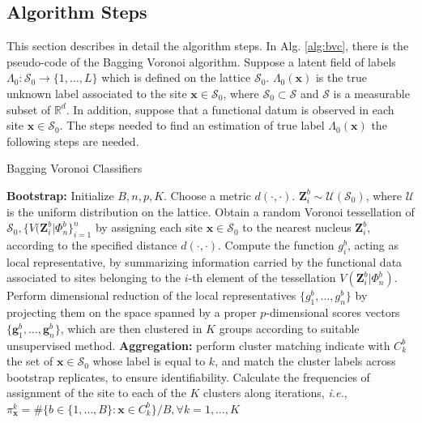 \subsection{Algorithm Steps}
\label{subsec:algsteps}
This section describes in detail the algorithm steps. In Alg. \ref{alg:bvc}, there is the pseudo-code of the Bagging Voronoi algorithm. Suppose a latent field of labels $\Lambda_0:\mathcal{S}_0 \rightarrow \{1,\dots,L\}$ which is defined on the lattice $\mathcal{S}_0$. $\Lambda_0(\mathbf{x})$ is the true unknown label associated to the site $\mathbf{x}\in\mathcal{S}_0$, where $\mathcal{S}_0 \subset \mathcal{S}$ and $\mathcal{S}$ is a measurable subset of $\mathbb{R}^d$. In addition, suppose that a functional datum is observed in each site $\mathbf{x}\in\mathcal{S_0}$. The steps needed to find an estimation of true label $\Lambda_0(\mathbf{x})$ the following steps are needed.

\begin{algorithm}
\scriptsize
    \caption{\footnotesize{Bagging Voronoi Classifiers}}
    \label{alg:bvc}
    \begin{algorithmic}
    \STATE \textbf{Bootstrap:}
    \STATE Initialize $B, n, p, K$. Choose a metric $d(\cdot,\cdot).$
    \STATE $\mathbf{Z}_i^b\sim\mathcal{U}(\mathcal{S}_0)$, where $\mathcal{U}$ is the uniform distribution on the lattice. Obtain a random Voronoi tessellation of $\mathcal{S}_0, \{V(\mathbf{Z}_i^b|\Phi_n^b\}^n_{i=1}$ by assigning each site $\mathbf{x}\in \mathcal{S}_0$ to the nearest nucleus $\mathbf{Z}_i^b$, according to the specified distance $d(\cdot,\cdot).$
    \ENDFOR
    \STATE Compute the function $g_i^b$, acting as local representative, by summarizing information carried by the functional data associated to sites belonging to the $i$-th element of the tessellation $V(\mathbf{Z}_i^b|\Phi_n^b)$.
    \ENDFOR
    \STATE Perform dimensional reduction of the local representatives $\{g_1^b,\dots, g_n^b\}$ by projecting them on the space spanned by a proper $p$-dimensional scores vectors $\{\mathbf{g}_1^b,\dots, \mathbf{g}_n^b\}$, which are then clustered in $K$ groups according to suitable unsupervised method.
    \ENDFOR
    \STATE \textbf{Aggregation:} perform cluster matching
    \STATE indicate with $C_k^b$ the set of $\mathbf{x} \in \mathcal{S}_0$ whose label is equal to $k$, and match the cluster labels across bootstrap replicates, to ensure identifiability.
    \ENDFOR
    \ENDFOR
    \STATE Calculate the frequencies of assignment of the site to each of the $K$ clusters along iterations, \textit{i.e.}, $\pi_{\mathbf{x}}^k=\#\{b\in\{1,\dots,B\}:\mathbf{x}\in C_k^b\}/B, \forall k=1,\dots,K$
    \ENDFOR
    \end{algorithmic}
\end{algorithm} 


